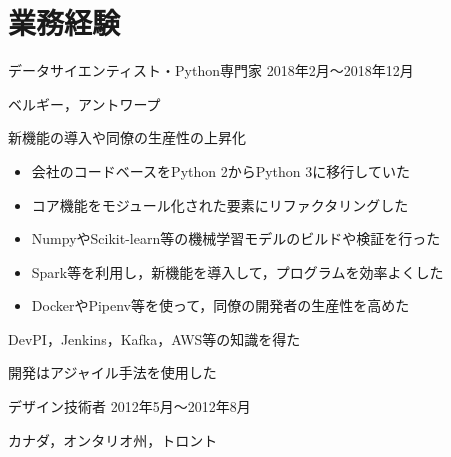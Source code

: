 \documentclass[10pt, a4paper]{article}
\begin{document}
\section{業務経験}
\begin{outerlist}
\item[\href{https://sentiance.com}{\parbox[t]{3cm}{\raggedleft Sentiance有限会社}}]{データサイエンティスト・Python専門家} \hfill {2018年2月〜2018年12月}

\hfill ベルギー，アントワープ
    \begin{innerlist}
    \item 新機能の導入や同僚の生産性の上昇化
    \begin{itemize}
        \item 会社のコードベースをPython 2からPython 3に移行していた
        \item コア機能をモジュール化された要素にリファクタリングした
        \item NumpyやScikit-learn等の機械学習モデルのビルドや検証を行った
        \item Spark等を利用し，新機能を導入して，プログラムを効率よくした
        \item DockerやPipenv等を使って，同僚の開発者の生産性を高めた
    \end{itemize}
    \item DevPI，Jenkins，Kafka，AWS等の知識を得た
    \item 開発はアジャイル手法を使用した
    \end{innerlist}

\item[\href{http://starquip.com/}{\parbox[t]{3cm}{\raggedleft Starquip Integrated Systems有限会社}}]{デザイン技術者} \hfill {2012年5月〜2012年8月}

\vspace{-\baselineskip}    
\hfill カナダ，オンタリオ州，トロント


\end{outerlist}
\end{document}
